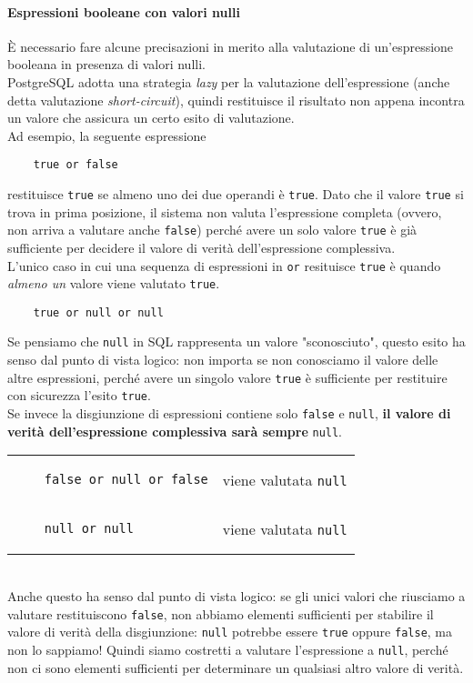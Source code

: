 \documentclass[12pt,a4paper]{book}
\begin{document}
	\paragraph{Espressioni booleane con valori nulli} È necessario fare alcune precisazioni in merito alla valutazione di un'espressione booleana in presenza di valori nulli.\\
	PostgreSQL adotta una strategia \textit{lazy} per la valutazione dell'espressione (anche detta valutazione \textit{short-circuit}), quindi restituisce il risultato non appena incontra un valore che assicura un certo esito di valutazione.\\Ad esempio, la seguente espressione
	\begin{lstlisting}
	true or false
	\end{lstlisting}
	restituisce \texttt{true} se almeno uno dei due operandi è \texttt{true}. Dato che il valore \texttt{true} si trova in prima posizione, il sistema non valuta l'espressione completa (ovvero, non arriva a valutare anche \texttt{false}) perché avere un solo valore \texttt{true} è già sufficiente per decidere il valore di verità dell'espressione complessiva.\\
	L'unico caso in cui una sequenza di espressioni in \texttt{or} resituisce \texttt{true} è quando \textit{almeno un} valore viene valutato \texttt{true}.
	\begin{lstlisting}
	true or null or null
	\end{lstlisting}
	Se pensiamo che \texttt{null} in SQL rappresenta un valore "sconosciuto", questo esito ha senso dal punto di vista logico: non importa se non conosciamo il valore delle altre espressioni, perché avere un singolo valore \texttt{true} è sufficiente per restituire con sicurezza l'esito \texttt{true}.\\
	Se invece la disgiunzione di espressioni contiene solo \texttt{false} e \texttt{null}, \textbf{il valore di verità dell'espressione complessiva sarà sempre} \texttt{null}.\vspace{10px}\\
	\setlength{\tabcolsep}{30pt}
	\begin{tabular}{l l}
	\begin{lstlisting}
	false or null or false
	\end{lstlisting} & viene valutata \texttt{null}\\
	\begin{lstlisting}
	null or null 
	\end{lstlisting} & viene valutata \texttt{null}\\
	\end{tabular}\vspace{10px}\\
	Anche questo ha senso dal punto di vista logico: se gli unici valori che riusciamo a valutare restituiscono \texttt{false}, non abbiamo elementi sufficienti per stabilire il valore di verità della disgiunzione: \texttt{null} potrebbe essere \texttt{true} oppure \texttt{false}, ma non lo sappiamo! Quindi siamo costretti a valutare l'espressione a \texttt{null}, perché non ci sono elementi sufficienti per determinare un qualsiasi altro valore di verità. 
\end{document}
